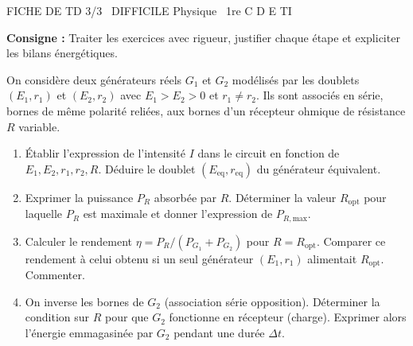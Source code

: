 \documentclass[11pt]{article}
\begin{document}
\begin{tcolorbox}[enhanced,colback=popink,colframe=popink,arc=10pt,boxrule=0pt,left=12pt,right=12pt,top=9pt,bottom=9pt]
{\color{white}\popxbold\small FICHE DE TD 3/3 \textbullet\ DIFFICILE \hfill Physique \textbullet\ 1re C D E TI\par}
\end{tcolorbox}
\vspace{4pt}
\noindent\textbf{Consigne :} Traiter les exercices avec rigueur, justifier chaque étape et expliciter les bilans énergétiques.

\begin{exercice}
On considère deux générateurs réels $G_1$ et $G_2$ modélisés par les doublets $(E_1, r_1)$ et $(E_2, r_2)$ avec $E_1 > E_2 > 0$ et $r_1 \neq r_2$. Ils sont associés en série, bornes de même polarité reliées, aux bornes d'un récepteur ohmique de résistance $R$ variable.
\begin{enumerate}
    \item Établir l'expression de l'intensité $I$ dans le circuit en fonction de $E_1, E_2, r_1, r_2, R$. Déduire le doublet $(E_{\text{eq}}, r_{\text{eq}})$ du générateur équivalent.
    \item Exprimer la puissance $P_R$ absorbée par $R$. Déterminer la valeur $R_{\text{opt}}$ pour laquelle $P_R$ est maximale et donner l'expression de $P_{R,\text{max}}$.
    \item Calculer le rendement $\eta = P_R / (P_{G_1} + P_{G_2})$ pour $R = R_{\text{opt}}$. Comparer ce rendement à celui obtenu si un seul générateur $(E_1, r_1)$ alimentait $R_{\text{opt}}$. Commenter.
    \item On inverse les bornes de $G_2$ (association série opposition). Déterminer la condition sur $R$ pour que $G_2$ fonctionne en récepteur (charge). Exprimer alors l'énergie emmagasinée par $G_2$ pendant une durée $\Delta t$.
\end{enumerate}
\end{exercice}
\end{document}
